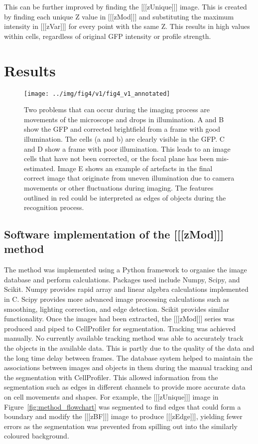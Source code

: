 \documentclass[preprint,11pt,5p,twocolumn]{elsarticle}
\begin{document}
This can be further improved by finding the [[[zUnique]]] image. This is created by finding each unique Z value in [[[zMod]]] and substituting the maximum intensity in [[[zVar]]] for every point with the same Z. This results in high values within cells, regardless of original GFP intensity or profile strength.

\section{Results}
\label{S:results}

\begin{figure}
\centering\texttt{[image: ../img/fig4/v1/fig4\_v1\_annotated]}
\label{fig:problems}
\caption{Two problems that can occur during the imaging process are movements of the microscope and drops in illumination. A and B show the GFP and corrected brightfield from a frame with good illumination. The cells (a and b) are clearly visible in the GFP. C and D show a frame with poor illumination. This leads to an image cells that have not been corrected, or the focal plane has been mis-estimated. Image E shows an example of artefacts in the final correct image that originate from uneven illumination due to camera movements or other fluctuations during imaging. The features outlined in red could be interpreted as edges of objects during the recognition process.}
\end{figure}

\subsection{Software implementation of the [[[zMod]]] method}

The method was implemented using a Python framework to organise the image database and perform calculations. Packages used include Numpy, Scipy, and Scikit. Numpy provides rapid array and linear algebra calculations implemented in C. Scipy provides more advanced image processing calculations such as smoothing, lighting correction, and edge detection. Scikit provides similar functionality. Once the images had been extracted, the [[[zMod]]] series was produced and piped to CellProfiler for segmentation. Tracking was achieved manually. No currently available tracking method was able to accurately track the objects in the available data. This is partly due to the quality of the data and the long time delay between frames. The database system helped to maintain the associations between images and objects in them during the manual tracking and the segmentation with CellProfiler. This allowed information from the segmentation such as edges in different channels to provide more accurate data on cell movements and shapes. For example, the [[[zUnique]]] image in Figure~\ref{fig:method_flowchart} was segmented to find edges that could form a boundary and modify the [[[zBF]]] image to produce [[[zEdge]]], yielding fewer errors as the segmentation was prevented from spilling out into the similarly coloured background.
\end{document}
